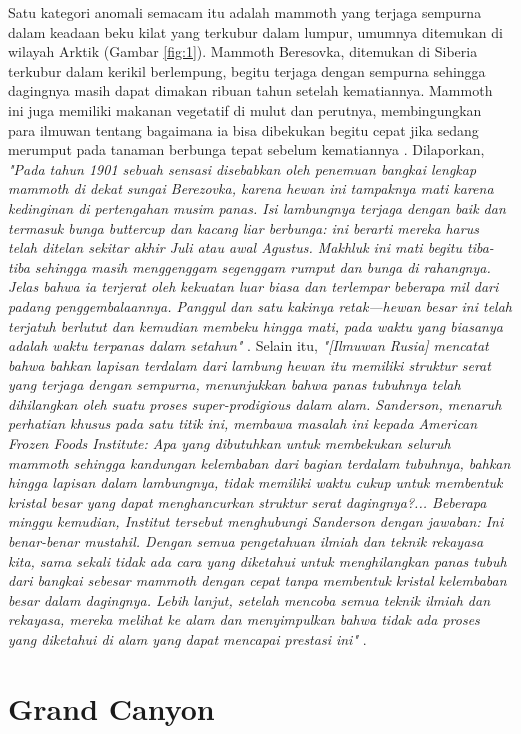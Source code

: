 \documentclass[10pt,twocolumn,letterpaper]{article}
\begin{document}
Satu kategori anomali semacam itu adalah mammoth yang terjaga sempurna dalam keadaan beku kilat yang terkubur dalam lumpur, umumnya ditemukan di wilayah Arktik (Gambar \ref{fig:1}). Mammoth Beresovka, ditemukan di Siberia terkubur dalam kerikil berlempung, begitu terjaga dengan sempurna sehingga dagingnya masih dapat dimakan ribuan tahun setelah kematiannya. Mammoth ini juga memiliki makanan vegetatif di mulut dan perutnya, membingungkan para ilmuwan tentang bagaimana ia bisa dibekukan begitu cepat jika sedang merumput pada tanaman berbunga tepat sebelum kematiannya \cite{17}. Dilaporkan, \textit{"Pada tahun 1901 sebuah sensasi disebabkan oleh penemuan bangkai lengkap mammoth di dekat sungai Berezovka, karena hewan ini tampaknya mati karena kedinginan di pertengahan musim panas. Isi lambungnya terjaga dengan baik dan termasuk bunga buttercup dan kacang liar berbunga: ini berarti mereka harus telah ditelan sekitar akhir Juli atau awal Agustus. Makhluk ini mati begitu tiba-tiba sehingga masih menggenggam segenggam rumput dan bunga di rahangnya. Jelas bahwa ia terjerat oleh kekuatan luar biasa dan terlempar beberapa mil dari padang penggembalaannya. Panggul dan satu kakinya retak—hewan besar ini telah terjatuh berlutut dan kemudian membeku hingga mati, pada waktu yang biasanya adalah waktu terpanas dalam setahun"} \cite{18}. Selain itu, \textit{"[Ilmuwan Rusia] mencatat bahwa bahkan lapisan terdalam dari lambung hewan itu memiliki struktur serat yang terjaga dengan sempurna, menunjukkan bahwa panas tubuhnya telah dihilangkan oleh suatu proses super-prodigious dalam alam. Sanderson, menaruh perhatian khusus pada satu titik ini, membawa masalah ini kepada American Frozen Foods Institute: Apa yang dibutuhkan untuk membekukan seluruh mammoth sehingga kandungan kelembaban dari bagian terdalam tubuhnya, bahkan hingga lapisan dalam lambungnya, tidak memiliki waktu cukup untuk membentuk kristal besar yang dapat menghancurkan struktur serat dagingnya?... Beberapa minggu kemudian, Institut tersebut menghubungi Sanderson dengan jawaban: Ini benar-benar mustahil. Dengan semua pengetahuan ilmiah dan teknik rekayasa kita, sama sekali tidak ada cara yang diketahui untuk menghilangkan panas tubuh dari bangkai sebesar mammoth dengan cepat tanpa membentuk kristal kelembaban besar dalam dagingnya. Lebih lanjut, setelah mencoba semua teknik ilmiah dan rekayasa, mereka melihat ke alam dan menyimpulkan bahwa tidak ada proses yang diketahui di alam yang dapat mencapai prestasi ini"} \cite{19}.

\section{Grand Canyon}
\end{document}
